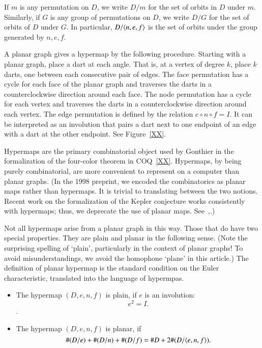 If $m$ is any permutation on $D$, we write $D/m$ for the
set of orbits in $D$ under $m$.  Similarly, if $G$ is any
group of permutations on $D$, we write $D/G$ for the set
of orbits of $D$ under $G$.  In particular, $D/\langle n,e,f\rangle$
is the set of orbits under the group generated by $n,e,f$.

A planar graph gives  a hypermap
by the following procedure.  Starting with a planar graph,
place a dart at each angle.  That is, at a vertex of degree $k$,
place $k$ darts, one between each consecutive pair of edges.
The face permutation has a cycle for
each face of the planar graph and  traverses the
darts in a counterclockwise direction around each face.
The node permutation has a cycle for each vertex and traverses
the darts in a counterclockwise direction around each vertex.
The edge permutation is defined by the relation $e\circ n\circ f=I$.
It can be interpreted as an involution that pairs a dart next
to one endpoint of an edge with a dart at the other endpoint.
See Figure~\ref{XX}.

Hypermaps are the primary combinatorial object used by Gonthier
in the formalization of the four-color theorem in COQ~\ref{XX}.
Hypermaps, by being purely combinatorial, are more convenient
to represent on a computer than planar graphs.  (In the 1998
preprint, we encoded the combinatorics as planar maps rather
than hypermaps.  It is trivial to translating between the two notions.
Recent work on the formalization of the Kepler conjecture works
consistently with hypermaps; thus, we deprecate the use of
planar maps.  See~\cite{XXObua},\cite{XXBlue}.)

Not all hypermaps arise from a planar graph in this way.
Those that do have two special properties.  They are plain
and planar in the following sense.  (Note the surprising spelling
of `plain', particularly in the context of planar graphs!  
To avoid misunderstandings, 
we avoid the homophone `plane' in this article.)  The definition
of planar hypermap is the standard condition on the Euler
characteristic, translated into the language of hypermpas.

\begin{definition}\label{def:plain}

\begin{itemize}
\item The hypermap $(D,e,n,f)$ is plain, if $e$ is an involution:
$$
 e^2 = I.
$$.
\item The hypermap $(D,e,n,f)$ is planar, if
   $$
   \#(D/e) + \#(D/n) + \#(D/f) = \# D + 2\#(D/\langle e,n,f\rangle).
   $$
\end{itemize}
\end{definition}



